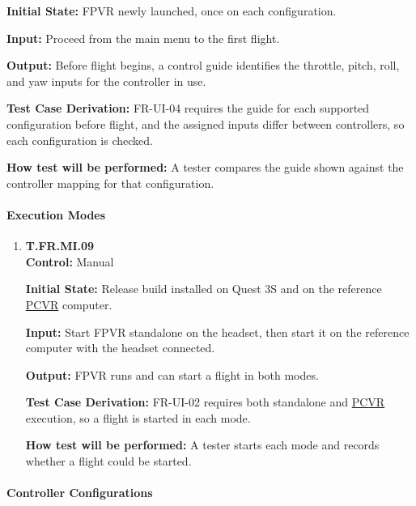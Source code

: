 \documentclass[12pt, titlepage]{article}
\begin{document}
{\begin{enumerate}
\textbf{Initial State:} FPVR newly launched, once on each configuration.

\textbf{Input:} Proceed from the main menu to the first flight.

\textbf{Output:} Before flight begins, a control guide identifies the throttle, pitch,
roll, and yaw inputs for the controller in use.

\textbf{Test Case Derivation:} \mbox{FR-UI-04} requires the guide for each supported
configuration before flight, and the assigned inputs differ between controllers, so each
configuration is checked.

\textbf{How test will be performed:} A tester compares the guide shown against the
controller mapping for that configuration.

\end{enumerate}

\paragraph{Execution Modes}

\begin{enumerate}

\item{\hypertarget{test-fr-mi-09}{}\textbf{T.FR.MI.09}\\}
\textbf{Control:} Manual

\textbf{Initial State:} Release build installed on Quest 3S and on the reference \hyperlink{abbr:PCVR}{PCVR}
computer.

\textbf{Input:} Start FPVR standalone on the headset, then start it on the reference
computer with the headset connected.

\textbf{Output:} FPVR runs and can start a flight in both modes.

\textbf{Test Case Derivation:} \mbox{FR-UI-02} requires both standalone and \hyperlink{abbr:PCVR}{PCVR}
execution, so a flight is started in each mode.

\textbf{How test will be performed:} A tester starts each mode and records whether a
flight could be started.

\end{enumerate}

\paragraph{Controller Configurations}

\begin{enumerate}


\end{enumerate}}
\end{document}
